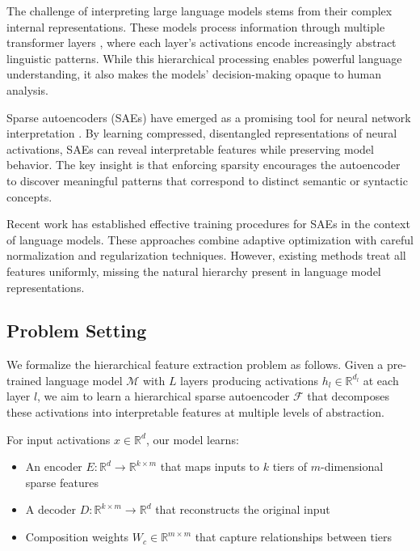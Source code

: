 \documentclass{article} %
\begin{document}
The challenge of interpreting large language models stems from their complex internal representations. These models process information through multiple transformer layers \cite{vaswani2017attention}, where each layer's activations encode increasingly abstract linguistic patterns. While this hierarchical processing enables powerful language understanding, it also makes the models' decision-making opaque to human analysis.

Sparse autoencoders (SAEs) have emerged as a promising tool for neural network interpretation \cite{goodfellow2016deep}. By learning compressed, disentangled representations of neural activations, SAEs can reveal interpretable features while preserving model behavior. The key insight is that enforcing sparsity encourages the autoencoder to discover meaningful patterns that correspond to distinct semantic or syntactic concepts.

Recent work has established effective training procedures for SAEs in the context of language models. These approaches combine adaptive optimization \cite{kingma2014adam} with careful normalization \cite{ba2016layer} and regularization \cite{loshchilov2017adamw} techniques. However, existing methods treat all features uniformly, missing the natural hierarchy present in language model representations.

\subsection{Problem Setting}
We formalize the hierarchical feature extraction problem as follows. Given a pre-trained language model $\mathcal{M}$ with $L$ layers producing activations $h_l \in \mathbb{R}^{d_l}$ at each layer $l$, we aim to learn a hierarchical sparse autoencoder $\mathcal{F}$ that decomposes these activations into interpretable features at multiple levels of abstraction.

For input activations $x \in \mathbb{R}^d$, our model learns:
\begin{itemize}
    \item An encoder $E: \mathbb{R}^d \rightarrow \mathbb{R}^{k \times m}$ that maps inputs to $k$ tiers of $m$-dimensional sparse features
    \item A decoder $D: \mathbb{R}^{k \times m} \rightarrow \mathbb{R}^d$ that reconstructs the original input
    \item Composition weights $W_c \in \mathbb{R}^{m \times m}$ that capture relationships between tiers
\end{itemize}
\end{document}
